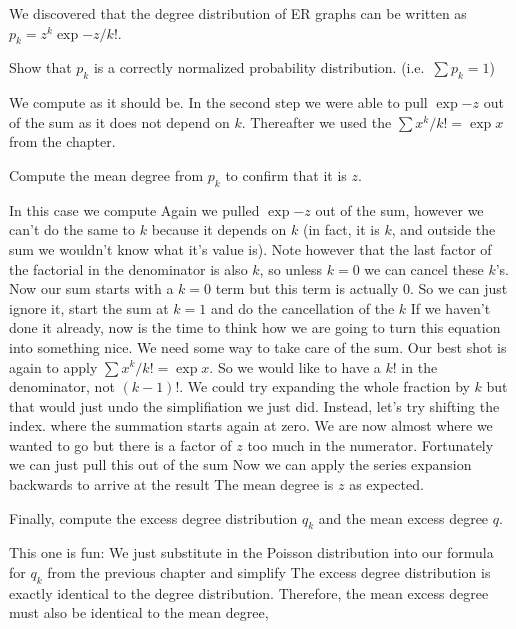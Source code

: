 

We discovered that the degree distribution of ER graphs can be written as $p_k=z^{k}\exp{-z}/{k!}$.

\subquestion 
Show that $p_k$ is a correctly normalized probability distribution. (i.e.~$\sum p_k=1$)

\solution
We compute 
as it should be. In the second step we were able to pull $\exp{-z}$ out of the sum as it does not depend on $k$. Thereafter we used the 
$\sum x^k /k! = \exp{x}$ from the chapter. 

\subquestion
Compute the mean degree from $p_k$ to confirm that it is $z$.

\solution
In this case we compute
Again we pulled $\exp{-z}$ out of the sum, however we can't do the same to $k$ because it depends on $k$ (in fact, it is $k$, and outside the sum we wouldn't know what it's value is). 
Note however that the last factor of the factorial in the denominator is also $k$, so unless $k=0$ we can cancel these $k$'s. Now our sum starts with a $k=0$ term but this term is actually 0. So we can just ignore it, start the sum at $k=1$ and do the cancellation of the $k$
If we haven't done it already, now is the time to think how we are going to turn this equation into something nice. We need some way to 
take care of the sum. Our best shot is again to apply $\sum x^k/k!=\exp{x}$. So we would like to have a $k!$ in the denominator, not $(k-1)!$. We could try expanding the whole fraction by $k$ but that would just undo the simplifiation we just did. Instead, let's try shifting the index. 
where the summation starts again at zero. We are now almost where we wanted to go but there is a factor of $z$ too much in the numerator. Fortunately we can just pull this out of the sum
Now we can apply the series expansion backwards to arrive at the result
The mean degree is $z$ as expected. 

\subquestion
Finally, compute the excess degree distribution $q_k$ and the mean excess degree $q$.

\solution
This one is fun: We just substitute in the Poisson distribution into our formula for $q_k$ from the previous chapter and simplify
The excess degree distribution is exactly identical to the degree distribution. Therefore, the mean excess degree must also be identical to the mean degree,

